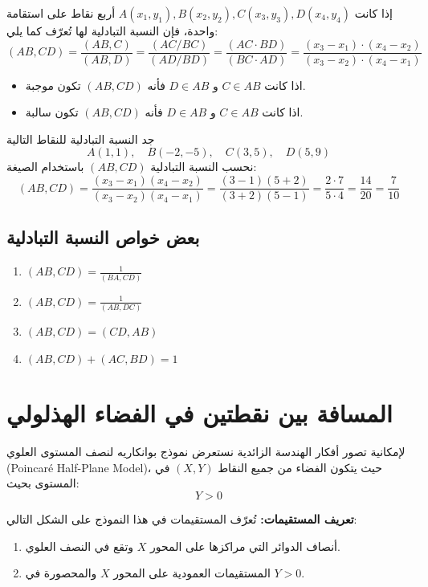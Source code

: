 \begin{definition}
	إذا كانت 
	$A(x_1, y_1), B(x_2, y_2), C(x_3, y_3), D(x_4, y_4)$ أربع نقاط على استقامة واحدة، فإن النسبة التبادلية لها تُعرّف كما يلي:
	\[
	(AB, CD) = \frac{(AB, C)}{(AB, D)} = \frac{(AC/BC)}{(AD/BD)} = \frac{(AC \cdot BD)}{(BC \cdot AD)} = \frac{(x_3 - x_1) \cdot (x_4 - x_2)}{(x_3 - x_2)\cdot(x_4 - x_1)}
	\]
	\begin{itemize}[label=\textbullet, leftmargin=*]
		\item اذا كانت $C\in AB$ و $D\in AB$ فأنه $(AB, CD)$ تكون موجبة.
		\item اذا كانت $C\in AB$ و $D\in AB$ فأنه $(AB, CD)$ تكون سالبة.
		
	\end{itemize}
\end{definition}
\begin{example}
	جد النسبة التبادلية للنقاط التالية
	\[
	A(1,1), \quad B(-2,-5), \quad C(3,5), \quad D(5,9)
	\]
	نحسب النسبة التبادلية \((AB,CD)\) باستخدام الصيغة:
	\[
	(AB,CD) = \frac{(x_3 - x_1)(x_4 - x_2)}{(x_3 - x_2)(x_4 - x_1)}
	 =\frac{(3-1)(5+2)}{(3+2)(5-1)} = \frac{2 \cdot 7}{5 \cdot 4} = \frac{14}{20} = \frac{7}{10}
	\]
\end{example}

\subsection*{بعض خواص النسبة التبادلية}
\begin{enumerate}
	\item $(AB, CD) = \frac{1}{(BA, CD)}$
	\item $(AB, CD) = \frac{1}{(AB, DC)}$
	\item $(AB, CD) = (CD, AB)$
	\item $(AB, CD) + (AC, BD) = 1$
\end{enumerate}

\section{المسافة بين نقطتين في الفضاء الهذلولي}

لإمكانية تصور أفكار الهندسة الزائدية نستعرض نموذج بوانكاريه لنصف المستوى العلوي (Poincaré Half-Plane Model)، حيث يتكون الفضاء من جميع النقاط $(X,Y)$ في المستوى بحيث:
\[
Y > 0
\]

\textbf{تعريف المستقيمات:}
تُعرّف المستقيمات في هذا النموذج على الشكل التالي:
\begin{enumerate}
	\item أنصاف الدوائر التي مراكزها على المحور $X$ وتقع في النصف العلوي.
	\item المستقيمات العمودية على المحور $X$ والمحصورة في $Y > 0$.
\end{enumerate}

